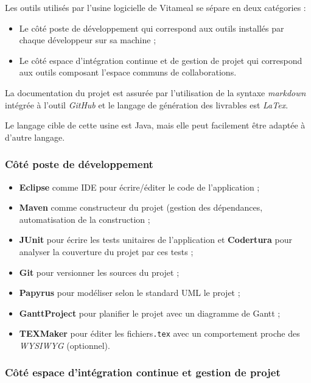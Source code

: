 Les outils utilisés par l'usine logicielle de Vitameal se sépare en deux catégories :

\begin{itemize}
	\item Le côté poste de développement qui correspond aux outils installés par chaque développeur sur sa machine ;
	\item Le côté espace d'intégration continue et de gestion de projet qui correspond aux outils composant l'espace communs de collaborations.
\end{itemize}

La documentation du projet est assurée par l'utilisation de la syntaxe \emph{markdown} intégrée à l'outil \emph{GitHub} et le langage de génération des livrables est \emph{LaTex}.

Le langage cible de cette usine est Java, mais elle peut facilement être adaptée à d'autre langage.

\subsubsection{Côté poste de développement}

\begin{itemize}
	\item \textbf{Eclipse} comme IDE pour écrire/éditer le code de l'application ;
	\item \textbf{Maven} comme constructeur du projet (gestion des dépendances, automatisation de la construction ;
	\item \textbf{JUnit} pour écrire les tests unitaires de l'application et \textbf{Codertura} pour analyser la couverture du projet par ces tests ;
	\item \textbf{Git} pour versionner les sources du projet ;
	\item \textbf{Papyrus} pour modéliser selon le standard UML le projet ;
	\item \textbf{GanttProject} pour planifier le projet avec un diagramme de Gantt ;
	\item \textbf{TEXMaker} pour éditer les fichiers\texttt{.tex} avec un comportement proche des \emph{WYSIWYG} (optionnel).
\end{itemize}

\subsubsection{Côté espace d'intégration continue et gestion de projet}

